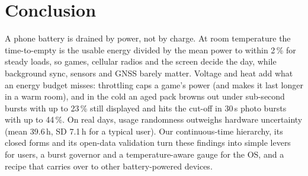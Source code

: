 \section{Conclusion}\label{sec:conclusion}
A phone battery is drained by power, not by charge. At room temperature the time-to-empty is the usable energy
divided by the mean power to within 2\,\% for steady loads, so games, cellular radios and the screen decide the day,
while background sync, sensors and GNSS barely matter. Voltage and heat add what an energy budget misses: throttling
caps a game's power (and makes it last longer in a warm room), and in the cold an aged pack browns out under
sub-second bursts with up to 23\,\% still displayed and hits the cut-off in 30\,s photo bursts with up to 44\,\%.
On real days, usage randomness outweighs hardware uncertainty (mean 39.6\,h, SD 7.1\,h for a typical user). Our continuous-time hierarchy, its closed forms and its open-data validation
turn these findings into simple levers for users, a burst governor and a temperature-aware gauge for the OS, and a
recipe that carries over to other battery-powered devices.
